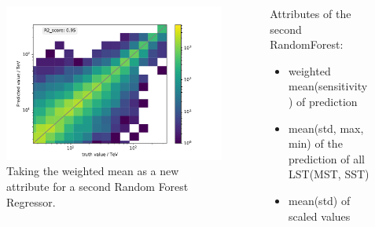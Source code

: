 \documentclass[aspectratio=1610, professionalfonts, 9pt]{beamer}
\begin{document}
  \begin{frame}
    \begin{columns}
        \begin{column}{0.5\textwidth}
          \begin{figure}
            \centering
            \includegraphics[width=\textwidth]{Plots/RF_MSV_encaps.pdf}
            \caption{Taking the weighted mean as a new attribute for a second Random Forest Regressor.}
          \end{figure}
        \end{column}
        \begin{column}{0.5\textwidth}
          Attributes of the second RandomForest:
          \begin{itemize}
            \item weighted mean(sensitivity) of prediction
            \item mean(std, max, min) of the prediction of all LST(MST, SST)
            \item mean(std) of scaled values
          \end{itemize}
        \end{column}
    \end{columns}

  \end{frame}
\end{document}
